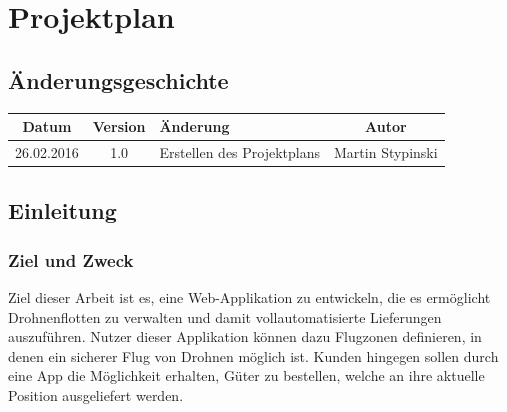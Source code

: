 

\newcommand{\greenbox}{
\begin{tikzpicture}
\draw[line width=0pt, fill=boxgreen]
(0, 0) rectangle (0.3, 0.3);
\end{tikzpicture}}

\newcommand{\orangebox}{
\begin{tikzpicture}
\draw[line width=0pt, fill=boxorange]
(0, 0) rectangle (0.3, 0.3);
\end{tikzpicture}}

\newcommand{\redbox}{
\begin{tikzpicture}
\draw[line width=0pt, fill=boxred]
(0, 0) rectangle (0.3, 0.3);
\end{tikzpicture}}


\chapter{Projektplan}
\section{Änderungsgeschichte}
\begin{tabularx}{\textwidth}{|c|c|X|c|}
  \hline
  \textbf{Datum} & \textbf{Version} & \textbf{Änderung} & \textbf{Autor} \\
  \hline \hline
  26.02.2016 & 1.0 & Erstellen des Projektplans & Martin Stypinski \\
  \hline
\end{tabularx}

\section{Einleitung}
\subsection{Ziel und Zweck}
Ziel dieser Arbeit ist es, eine Web-Applikation zu entwickeln, die es ermöglicht Drohnenflotten zu verwalten und damit vollautomatisierte Lieferungen auszuführen. Nutzer dieser Applikation können dazu Flugzonen definieren, in denen ein sicherer Flug von Drohnen möglich ist. Kunden hingegen sollen durch eine App die Möglichkeit erhalten, Güter zu bestellen, welche an ihre aktuelle Position ausgeliefert werden.

